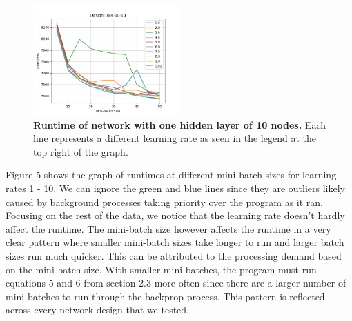 \documentclass[12pt]{article}
\theoremstyle{definition}
\theoremstyle{plain}
\begin{document}
\begin{figure}
	\centering
	\includegraphics[width=0.50\textwidth]{Images/Original/t10.png}
	\caption{\textbf{Runtime of network with one hidden layer of 10 nodes.} Each line represents a different learning rate as seen in the legend at the top right of the graph.}
	\label{fig:T10}
\end{figure}

\noindent Figure 5 shows the graph of runtimes at different mini-batch sizes for learning rates 1 \-- 10. We can ignore the green and blue lines since they are outliers likely caused by background processes taking priority over the program as it ran. Focusing on the rest of the data, we notice that the learning rate doesn't hardly affect the runtime. The mini-batch size however affects the runtime in a very clear pattern where smaller mini-batch sizes take longer to run and larger batch sizes run much quicker. This can be attributed to the processing demand based on the mini-batch size. With smaller mini-batches, the program must run equations 5 and 6 from section 2.3 more often since there are a larger number of mini-batches to run through the backprop process. This pattern is reflected across every network design that we tested. 
\end{document}
